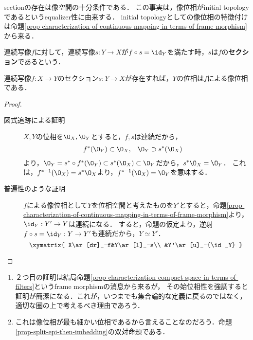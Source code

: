 \documentclass[uplatex,dvipdfmx]{jsreport}
\begin{document}
\begin{tcolorbox}[colframe=ForestGreen, colback=ForestGreen!10!white, breakable ,colbacktitle=ForestGreen!40!white, coltitle=black,fonttitle=\bfseries\sffamily, title=$Y$の位相が全射$f$による像位相であるための十分条件]
    sectionの存在は像空間の十分条件である．
    この事実は，像位相がinitial topologyであるというequalizer性に由来する．
    initial topologyとしての像位相の特徴付けは命題\ref{prop-characterization-of-continuous-mapping-in-terms-of-frame-morphism}から来る．
\end{tcolorbox}

\begin{definition}[section]
    連続写像$f$に対して，連続写像$s:Y\to X$が$f\circ s=\id_Y$を満たす時，$s$は$f$の\textbf{セクション}であるという．
\end{definition}

\begin{proposition}\label{prop-section-existence-implies-initial-topology}
    連続写像$f:X\to Y$のセクション$s:Y\to X$が存在すれば，$Y$の位相は$f$による像位相である．
\end{proposition}
\begin{proof}\mbox{}
    \begin{description}
        \item[図式追跡による証明] 
    $X,Y$の位相を$\O_X,\O_Y$とすると，$f,s$は連続だから，
    \begin{align*}
        f^*(\O_Y)&\subset\O_X,&\O_Y&\supset s^*(\O_X)
    \end{align*}
    より，$\O_Y=s^*\circ f^*(\O_Y)\subset s^*(\O_X)\subset\O_Y$だから，$s^*\O_X=\O_Y$．
    これは，$f^{*-1}(\O_X)=s^*\O_X$より，$f^{*-1}(\O_X)=\O_Y$を意味する．
    \item[普遍性のような証明]
    $f$による像位相として$Y$を位相空間と考えたものを$Y'$とすると，命題\ref{prop-characterization-of-continuous-mapping-in-terms-of-frame-morphism}より，$\id_Y:Y'\to Y$は連続になる．
    すると，命題の仮定より，逆射$f\circ s=\id_Y:Y\to Y'$も連続だから，$Y\simeq Y'$．
    \[\xymatrix{
        X\ar[dr]_-f&Y\ar[l]_-s\\
        &Y'\ar[u]_-{\id_Y}
    }\]
    \end{description}
\end{proof}
\begin{remarks}
    \begin{enumerate}
        \item ２つ目の証明は結局命題\ref{prop-characterization-compact-space-in-terms-of-filters}というframe morphismの消息から来るが，
        その始位相性を強調すると証明が簡潔になる．これが，いつまでも集合論的な定義に戻るのではなく，適切な圏の上で考えるべき理由であろう．
        \item これは像位相が最も細かい位相であるから言えることなのだろう．命題\ref{prop-split-epi-then-imbedding}の双対命題である．
    \end{enumerate}
\end{remarks}
\end{document}
